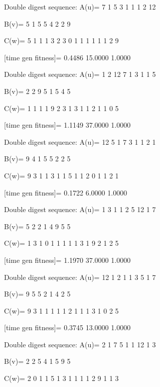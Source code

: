 Double digest sequence:
A(u)=
     7     1     5     3     1     1     1     2    12

B(v)=
     5     1     5     5     4     2     2     9

C(w)=
     5     1     1     1     3     2     3     0     1     1     1     1     1     1     2     9

[time gen fitness]=
    0.4486   15.0000    1.0000

Double digest sequence:
A(u)=
     1     2    12     7     1     3     1     1     5

B(v)=
     2     2     9     5     1     5     4     5

C(w)=
     1     1     1     1     9     2     3     1     3     1     1     2     1     1     0     5

[time gen fitness]=
    1.1149   37.0000    1.0000

Double digest sequence:
A(u)=
    12     5     1     7     3     1     1     2     1

B(v)=
     9     4     1     5     5     2     2     5

C(w)=
     9     3     1     1     3     1     1     5     1     1     2     0     1     1     2     1

[time gen fitness]=
    0.1722    6.0000    1.0000

Double digest sequence:
A(u)=
     1     3     1     1     2     5    12     1     7

B(v)=
     5     2     2     1     4     9     5     5

C(w)=
     1     3     1     0     1     1     1     1     1     3     1     9     2     1     2     5

[time gen fitness]=
    1.1970   37.0000    1.0000

Double digest sequence:
A(u)=
    12     1     2     1     1     3     5     1     7

B(v)=
     9     5     5     2     1     4     2     5

C(w)=
     9     3     1     1     1     1     1     2     1     1     1     3     1     0     2     5

[time gen fitness]=
    0.3745   13.0000    1.0000

Double digest sequence:
A(u)=
     2     1     7     5     1     1    12     1     3

B(v)=
     2     2     5     4     1     5     9     5

C(w)=
     2     0     1     1     5     1     3     1     1     1     1     2     9     1     1     3

